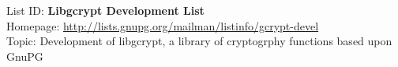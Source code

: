 
List ID: 	\textbf{Libgcrypt Development List}	\\
Homepage: 	\url{http://lists.gnupg.org/mailman/listinfo/gcrypt-devel}	\\	
Topic:		Development of libgcrypt, a library of cryptogrphy functions based upon GnuPG  \\

